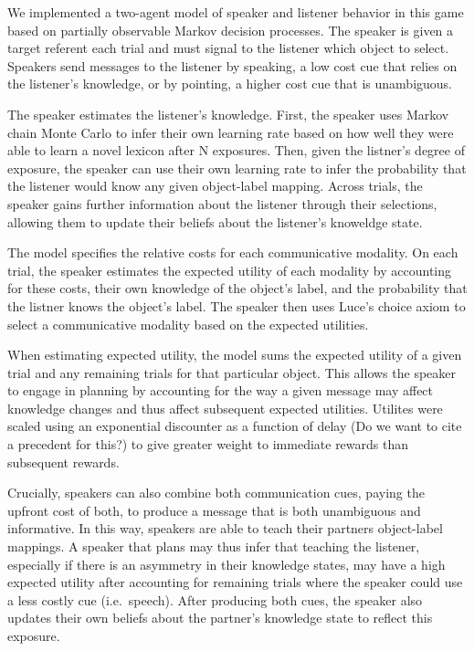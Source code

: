 \documentclass[10pt, letterpaper]{article}
\begin{document}
We implemented a two-agent model of speaker and listener behavior in
this game based on partially observable Markov decision processes. The
speaker is given a target referent each trial and must signal to the
listener which object to select. Speakers send messages to the listener
by speaking, a low cost cue that relies on the listener's knowledge, or
by pointing, a higher cost cue that is unambiguous.

The speaker estimates the listener's knowledge. First, the speaker uses
Markov chain Monte Carlo to infer their own learning rate based on how
well they were able to learn a novel lexicon after N exposures. Then,
given the listner's degree of exposure, the speaker can use their own
learning rate to infer the probability that the listener would know any
given object-label mapping. Across trials, the speaker gains further
information about the listener through their selections, allowing them
to update their beliefs about the listener's knoweldge state.

The model specifies the relative costs for each communicative modality.
On each trial, the speaker estimates the expected utility of each
modality by accounting for these costs, their own knowledge of the
object's label, and the probability that the listner knows the object's
label. The speaker then uses Luce's choice axiom to select a
communicative modality based on the expected utilities.

When estimating expected utility, the model sums the expected utility of
a given trial and any remaining trials for that particular object. This
allows the speaker to engage in planning by accounting for the way a
given message may affect knowledge changes and thus affect subsequent
expected utilities. Utilites were scaled using an exponential discounter
as a function of delay (Do we want to cite a precedent for this?) to
give greater weight to immediate rewards than subsequent rewards.

Crucially, speakers can also combine both communication cues, paying the
upfront cost of both, to produce a message that is both unambiguous and
informative. In this way, speakers are able to teach their partners
object-label mappings. A speaker that plans may thus infer that teaching
the listener, especially if there is an asymmetry in their knowledge
states, may have a high expected utility after accounting for remaining
trials where the speaker could use a less costly cue (i.e.~speech).
After producing both cues, the speaker also updates their own beliefs
about the partner's knowledge state to reflect this exposure.
\end{document}
